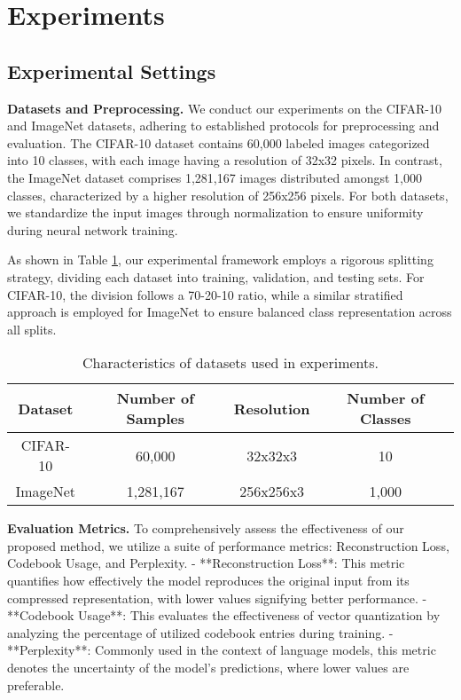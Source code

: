 \section{Experiments} %

\subsection{Experimental Settings} %
\textbf{Datasets and Preprocessing.} We conduct our experiments on the CIFAR-10 and ImageNet datasets, adhering to established protocols for preprocessing and evaluation. The CIFAR-10 dataset contains 60,000 labeled images categorized into 10 classes, with each image having a resolution of 32x32 pixels. In contrast, the ImageNet dataset comprises 1,281,167 images distributed amongst 1,000 classes, characterized by a higher resolution of 256x256 pixels. For both datasets, we standardize the input images through normalization to ensure uniformity during neural network training.

As shown in Table \ref{tab:datasets}, our experimental framework employs a rigorous splitting strategy, dividing each dataset into training, validation, and testing sets. For CIFAR-10, the division follows a 70-20-10 ratio, while a similar stratified approach is employed for ImageNet to ensure balanced class representation across all splits.

\begin{table}[h]
    \centering
    \begin{tabular}{|c|c|c|c|}
        \hline
        Dataset & Number of Samples & Resolution & Number of Classes \\
        \hline
        CIFAR-10 & 60,000 & 32x32x3 & 10 \\
        ImageNet & 1,281,167 & 256x256x3 & 1,000 \\
        \hline
    \end{tabular}
    \caption{Characteristics of datasets used in experiments.}
    \label{tab:datasets}
\end{table}

\textbf{Evaluation Metrics.} To comprehensively assess the effectiveness of our proposed method, we utilize a suite of performance metrics: Reconstruction Loss, Codebook Usage, and Perplexity. 
- **Reconstruction Loss**: This metric quantifies how effectively the model reproduces the original input from its compressed representation, with lower values signifying better performance. 
- **Codebook Usage**: This evaluates the effectiveness of vector quantization by analyzing the percentage of utilized codebook entries during training. 
- **Perplexity**: Commonly used in the context of language models, this metric denotes the uncertainty of the model’s predictions, where lower values are preferable.

